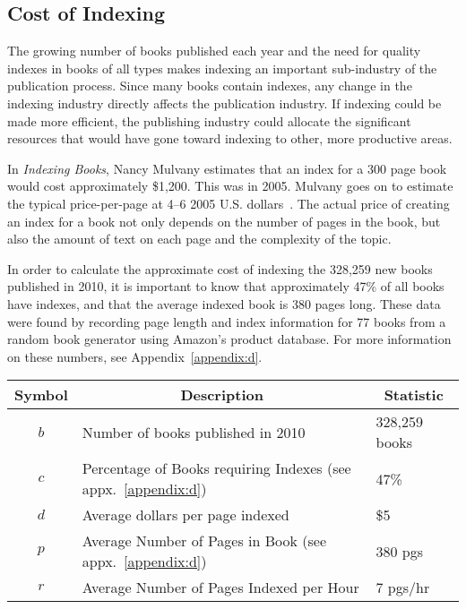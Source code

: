 \subsection{Cost of Indexing}

The growing number of books published each year and the need for quality indexes in books of all types makes indexing an important sub-industry of the publication process.
Since many books contain indexes, any change in the indexing industry directly affects the publication industry.
If indexing could be made more efficient, the publishing industry could allocate the significant resources that would have gone toward indexing to other, more productive areas.

In {\it Indexing Books}, Nancy Mulvany estimates that an index for a 300 page book would cost approximately \$1,200.
This was in 2005.
Mulvany goes on to estimate the typical price-per-page at 4--6 2005 U.S. dollars~\cite{mulvany}.
The actual price of creating an index for a book not only depends on the number of pages in the book, but also the amount of text on each page and the complexity of the topic.

In order to calculate the approximate cost of indexing the 328,259 new books published in 2010, it is important to know that approximately 47\% of all books have indexes, and that the average indexed book is 380 pages long.
These data were found by recording page length and index information for 77 books from a random book generator using Amazon's product database. For more information on these numbers, see Appendix~\ref{appendix:d}.

\begin{center}
\begin{tabular}{|c|l|l|}
\hline
\multicolumn{1}{|c|}{{\bf Symbol}} & \multicolumn{1}{c|}{{\bf Description}} & \multicolumn{1}{c|}{{\bf Statistic}} \\
\hline
$b$ & Number of books published in 2010 \cite{bowker} & 328,259 books \\
\hline
$c$ & Percentage of Books requiring Indexes (see appx.~\ref{appendix:d}) & 47\% \\
\hline
$d$ & Average dollars per page indexed \cite{mulvany} & \$5 \\
\hline 
$p$ & Average Number of Pages in Book (see appx.~\ref{appendix:d}) & 380 pgs \\ 
\hline 
$r$ & Average Number of Pages Indexed per Hour \cite{connolly} & 7 pgs/hr \\
\hline
\end{tabular}
\end{center}

